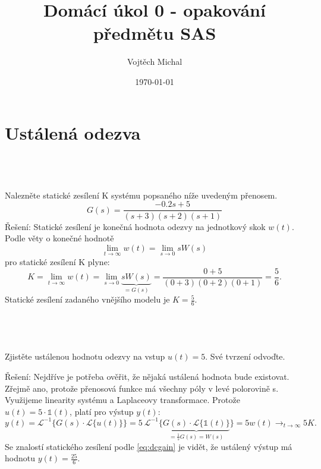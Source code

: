 \documentclass[twoside]{article}
\title{Domácí úkol 0 - opakování předmětu SAS}
\author{Vojtěch Michal}
\date{\today}
\begin{document}
\maketitle

\section{Ustálená odezva}
\label{sec:ukol1}

\subsection{~}
\label{sec:ukol1:1}
Nalezněte statické zesílení K systému popsaného níže uvedeným přenosem.
\begin{equation}
	G(s) = \frac{-0.2s+5}{(s+3)(s+2)(s+1)}
\end{equation}
Řešení: Statické zesílení je konečná hodnota odezvy na jednotkový skok $w(t)$. Podle věty o konečné hodnotě
\begin{equation}
	\lim_{t \to \infty}w(t) = \lim_{s \to 0}sW(s)
\end{equation}
pro statické zesílení K plyne:
\begin{equation}
	\label{eq:dcgain}
	K = \lim_{t \to \infty}w(t) = \lim_{s \to 0}{\underbrace{sW(s)}_{=G(s)}} = \frac{0+5}{(0+3)(0+2)(0+1)} = \frac{5}{6}.
\end{equation}
Statické zesílení zadaného vnějšího modelu je $K = \frac{5}{6}$.

\subsection{~}
Zjistěte ustálenou hodnotu odezvy na vstup $u (t) = 5$. Své tvrzení odvoďte.

Řešení: Nejdříve je potřeba ověřit, že nějaká ustálená hodnota bude existovat. Zřejmě ano, protože přenosová funkce má všechny póly
v levé polorovině s. Využijeme linearity systému a Laplaceovy transformace. Protože $u(t) = 5\cdot \mathbb{1}(t)$, platí pro výstup $y(t)$:
\begin{equation}
	y(t) = \mathcal{L}^{-1}\{G(s) \cdot \mathcal{L}\{u(t)\}\} = 5~\mathcal{L}^{-1}\{\underbrace{G(s) \cdot \mathcal{L}\{\mathbb{1}(t)\}}_{= \frac{1}{s}G(s)=W(s)}\}
	= 5 w(t) \longrightarrow_{t \to \infty} 5 K.
\end{equation}
Se znalostí statického zesílení podle \eqref{eq:dcgain} je vidět, že ustálený výstup má hodnotu $y(t)=\frac{25}{6}$.
\end{document}
